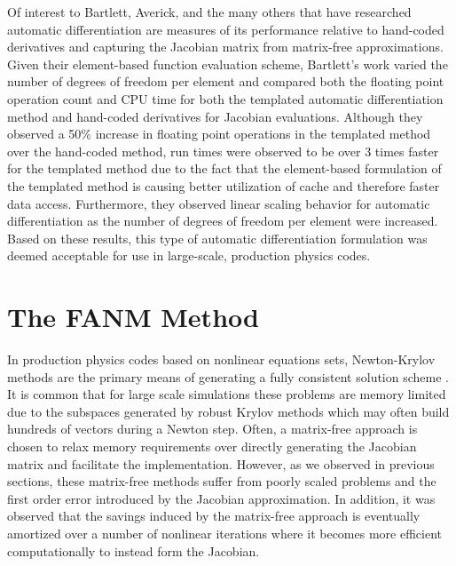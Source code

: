Of interest to Bartlett, Averick, and the many others that have
researched automatic differentiation are measures of its performance
relative to hand-coded derivatives and capturing the Jacobian matrix
from matrix-free approximations. Given their element-based function
evaluation scheme, Bartlett's work varied the number of degrees of
freedom per element and compared both the floating point operation
count and CPU time for both the templated automatic differentiation
method and hand-coded derivatives for Jacobian evaluations. Although
they observed a 50\% increase in floating point operations in the
templated method over the hand-coded method, run times were observed
to be over 3 times faster for the templated method due to the fact
that the element-based formulation of the templated method is causing
better utilization of cache and therefore faster data
access. Furthermore, they observed linear scaling behavior for
automatic differentiation as the number of degrees of freedom per
element were increased. Based on these results, this type of automatic
differentiation formulation was deemed acceptable for use in
large-scale, production physics codes.

\section{The FANM Method\ }
\label{sec:fanm}
In production physics codes based on nonlinear equations sets,
Newton-Krylov methods are the primary means of generating a fully
consistent solution scheme
\cite{evans_development_2006,evans_enhanced_2007,gaston_parallel_2009,godoy_parallel_2012}. It
is common that for large scale simulations these problems are memory
limited due to the subspaces generated by robust Krylov methods which
may often build hundreds of vectors during a Newton step. Often, a
matrix-free approach is chosen to relax memory requirements over
directly generating the Jacobian matrix and facilitate the
implementation. However, as we observed in previous sections, these
matrix-free methods suffer from poorly scaled problems and the first
order error introduced by the Jacobian approximation. In addition, it
was observed that the savings induced by the matrix-free approach is
eventually amortized over a number of nonlinear iterations where it
becomes more efficient computationally to instead form the Jacobian.

